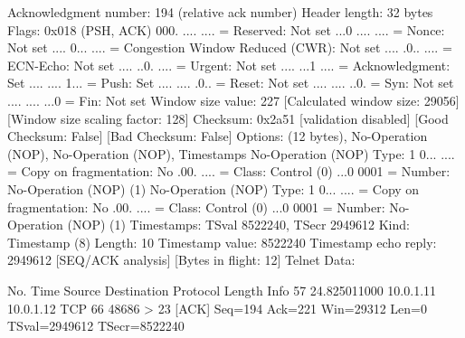     Acknowledgment number: 194    (relative ack number)
    Header length: 32 bytes
    Flags: 0x018 (PSH, ACK)
        000. .... .... = Reserved: Not set
        ...0 .... .... = Nonce: Not set
        .... 0... .... = Congestion Window Reduced (CWR): Not set
        .... .0.. .... = ECN-Echo: Not set
        .... ..0. .... = Urgent: Not set
        .... ...1 .... = Acknowledgment: Set
        .... .... 1... = Push: Set
        .... .... .0.. = Reset: Not set
        .... .... ..0. = Syn: Not set
        .... .... ...0 = Fin: Not set
    Window size value: 227
    [Calculated window size: 29056]
    [Window size scaling factor: 128]
    Checksum: 0x2a51 [validation disabled]
        [Good Checksum: False]
        [Bad Checksum: False]
    Options: (12 bytes), No-Operation (NOP), No-Operation (NOP), Timestamps
        No-Operation (NOP)
            Type: 1
                0... .... = Copy on fragmentation: No
                .00. .... = Class: Control (0)
                ...0 0001 = Number: No-Operation (NOP) (1)
        No-Operation (NOP)
            Type: 1
                0... .... = Copy on fragmentation: No
                .00. .... = Class: Control (0)
                ...0 0001 = Number: No-Operation (NOP) (1)
        Timestamps: TSval 8522240, TSecr 2949612
            Kind: Timestamp (8)
            Length: 10
            Timestamp value: 8522240
            Timestamp echo reply: 2949612
    [SEQ/ACK analysis]
        [Bytes in flight: 12]
Telnet
    Data: 

No.     Time           Source                Destination           Protocol Length Info
     57 24.825011000   10.0.1.11             10.0.1.12             TCP      66     48686 > 23 [ACK] Seq=194 Ack=221 Win=29312 Len=0 TSval=2949612 TSecr=8522240

